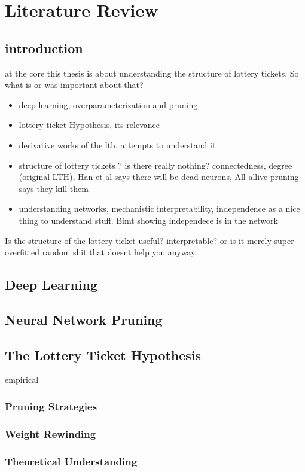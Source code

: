 \section{Literature Review}


\subsection{introduction}
at the core this thesis is about understanding the structure of lottery tickets. So what is or was important about that?
\begin{itemize}
    \item deep learning, overparameterization and pruning
    \item lottery ticket Hypothesis, its relevance 
    \item derivative works of the lth, attempts to understand it
    \item structure of lottery tickets ? is there really nothing? connectedness, degree (original LTH), Han et al says there will be dead neurons, All allive pruning says they kill them
    \item understanding networks, mechanistic interpretability, independence as a nice thing to understand stuff. Bimt showing independece is in the network
\end{itemize}

Is the structure of the lottery ticket useful? interpretable? or is it merely super overfitted random shit that doesnt help you anyway.

\subsection{Deep Learning}
\subsection{Neural Network Pruning}
\subsection{The Lottery Ticket Hypothesis}
empirical 
\subsubsection{Pruning Strategies}
\subsubsection{Weight Rewinding}
\subsubsection{Theoretical Understanding}

